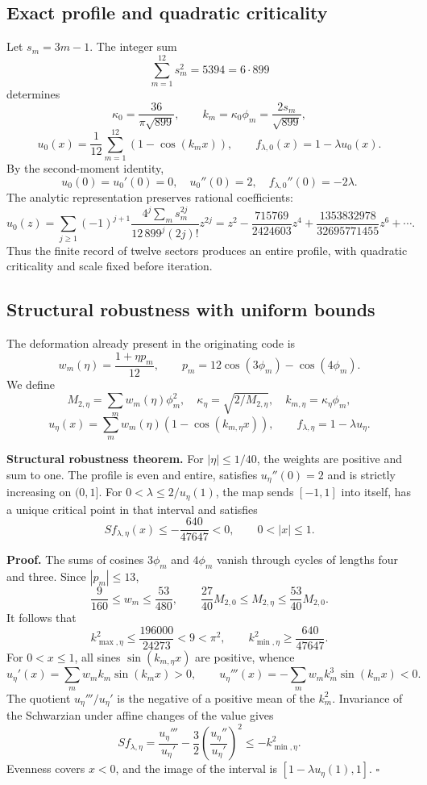 \subsection{Exact profile and quadratic criticality}
\label{hmtfg:desarrollo:2}

Let \(s_m=3m-1\). The integer sum
\[
\sum_{m=1}^{12}s_m^2=5394=6\cdot899
\]
determines
\[
\kappa_0=\frac{36}{\pi\sqrt{899}},\qquad
k_m=\kappa_0\phi_m=\frac{2s_m}{\sqrt{899}},
\]
\[
u_0(x)=\frac1{12}\sum_{m=1}^{12}(1-\cos(k_mx)),\qquad
f_{\lambda,0}(x)=1-\lambda u_0(x).
\]
By the second-moment identity,
\[
u_0(0)=u_0'(0)=0,\quad u_0''(0)=2,\quad
f_{\lambda,0}''(0)=-2\lambda.
\]
The analytic representation preserves rational coefficients:
\[
u_0(z)=\sum_{j\ge1}(-1)^{j+1}
\frac{4^j\sum_m s_m^{2j}}{12\,899^j(2j)!}z^{2j}
=z^2-\frac{715769}{2424603}z^4
+\frac{1353832978}{32695771455}z^6+\cdots.
\]
Thus the finite record of twelve sectors produces an entire profile, with quadratic criticality and scale fixed before iteration.


\subsection{Structural robustness with uniform bounds}
\label{hmtfg:desarrollo:3}

The deformation already present in the originating code is
\[
w_m(\eta)=\frac{1+\eta p_m}{12},\qquad
p_m=12\cos(3\phi_m)-\cos(4\phi_m).
\]
We define
\[
M_{2,\eta}=\sum_mw_m(\eta)\phi_m^2,\quad
\kappa_\eta=\sqrt{2/M_{2,\eta}},\quad k_{m,\eta}=\kappa_\eta\phi_m,
\]
\[
u_\eta(x)=\sum_mw_m(\eta)(1-\cos(k_{m,\eta}x)),\qquad
f_{\lambda,\eta}=1-\lambda u_\eta.
\]

\textbf{Structural robustness theorem.} For \(|\eta|\le1/40\), the weights are positive and sum to one. The profile is even and entire, satisfies \(u_\eta''(0)=2\) and is strictly increasing on \((0,1]\). For \(0<\lambda\le2/u_\eta(1)\), the map sends \([-1,1]\) into itself, has a unique critical point in that interval and satisfies
\[
S f_{\lambda,\eta}(x)\le-\frac{640}{47647}<0,\qquad0<|x|\le1.
\]

\textbf{Proof.} The sums of cosines \(3\phi_m\) and \(4\phi_m\) vanish through cycles of lengths four and three. Since \(|p_m|\le13\),
\[
\frac9{160}\le w_m\le\frac{53}{480},\qquad
\frac{27}{40}M_{2,0}\le M_{2,\eta}\le\frac{53}{40}M_{2,0}.
\]
It follows that
\[
k_{\max,\eta}^2\le\frac{196000}{24273}<9<\pi^2,\qquad
k_{\min,\eta}^2\ge\frac{640}{47647}.
\]
For \(0<x\le1\), all sines \(\sin(k_{m,\eta}x)\) are positive, whence
\[
u_\eta'(x)=\sum_mw_mk_m\sin(k_mx)>0,\qquad
u_\eta'''(x)=-\sum_mw_mk_m^3\sin(k_mx)<0.
\]
The quotient \(u_\eta'''/u_\eta'\) is the negative of a positive mean of the \(k_m^2\). Invariance of the Schwarzian under affine changes of the value gives
\[
S f_{\lambda,\eta}
=\frac{u_\eta'''}{u_\eta'}-\frac32
\left(\frac{u_\eta''}{u_\eta'}\right)^2
\le-k_{\min,\eta}^2.
\]
Evenness covers \(x<0\), and the image of the interval is
\([1-\lambda u_\eta(1),1]\). \(\square\)

